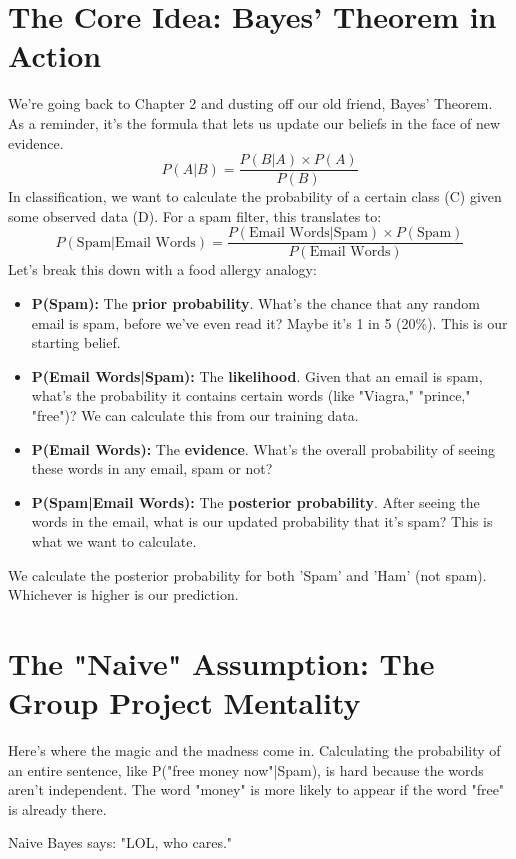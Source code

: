 \documentclass[11pt, letterpaper, openany]{book}
\begin{document}
\section{The Core Idea: Bayes' Theorem in Action}

We're going back to Chapter 2 and dusting off our old friend, Bayes' Theorem. As a reminder, it's the formula that lets us update our beliefs in the face of new evidence.
\[ P(A|B) = \frac{P(B|A) \times P(A)}{P(B)} \]
In classification, we want to calculate the probability of a certain class (C) given some observed data (D). For a spam filter, this translates to:
\[ P(\text{Spam}|\text{Email Words}) = \frac{P(\text{Email Words}|\text{Spam}) \times P(\text{Spam})}{P(\text{Email Words})} \]
Let's break this down with a food allergy analogy:
\begin{itemize}
    \item \textbf{P(Spam):} The \textbf{prior probability}. What's the chance that any random email is spam, before we've even read it? Maybe it's 1 in 5 (20\%). This is our starting belief.
    \item \textbf{P(Email Words|Spam):} The \textbf{likelihood}. Given that an email is spam, what's the probability it contains certain words (like "Viagra," "prince," "free")? We can calculate this from our training data.
    \item \textbf{P(Email Words):} The \textbf{evidence}. What's the overall probability of seeing these words in any email, spam or not?
    \item \textbf{P(Spam|Email Words):} The \textbf{posterior probability}. After seeing the words in the email, what is our updated probability that it's spam? This is what we want to calculate.
\end{itemize}
We calculate the posterior probability for both 'Spam' and 'Ham' (not spam). Whichever is higher is our prediction.

\section{The "Naive" Assumption: The Group Project Mentality}

Here's where the magic and the madness come in. Calculating the probability of an entire sentence, like P("free money now"|Spam), is hard because the words aren't independent. The word "money" is more likely to appear if the word "free" is already there.

Naive Bayes says: "LOL, who cares."
\end{document}
